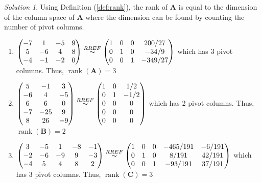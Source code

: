 \documentclass[
]{book}
\theoremstyle{definition}
\theoremstyle{definition}
\theoremstyle{definition}
\theoremstyle{remark}
\newtheorem*{solution}{Solution}
\begin{document}
\begin{solution}

Using Definition (\ref{def:rank}), the rank of \(\mathbf{A}\) is equal to the dimension of the column space of \(\mathbf{A}\) where the dimension can be found by counting the number of pivot columns.

\begin{enumerate}
\def\labelenumi{\arabic{enumi})}
\item
  \(\begin{pmatrix} -7 & 1 & -5 & 9 \\ 5 & -6 & 4 & 8 \\ -4 & -1 & -2 & 0 \end{pmatrix} \stackrel{RREF}{\huge \sim} \begin{pmatrix} 1 & 0 & 0 & 200/27 \\ 0 & 1 & 0 & -34/9 \\ 0 & 0 & 1 & -349/27 \end{pmatrix}\) which has 3 pivot columns. Thus, \(\operatorname{rank}(\mathbf{A}) = 3\)
\item
  \(\begin{pmatrix} 5 & -1 & 3 \\ -6 & 4 & -5 \\ 6 & 6 & 0 \\ -7 & -25 & 9 \\ 8 & 26 & -9 \end{pmatrix} \stackrel{RREF}{\huge \sim} \begin{pmatrix} 1 & 0 & 1/2 \\ 0 & 1 & -1/2 \\ 0 & 0 & 0 \\ 0 & 0 & 0 \\ 0 & 0 & 0 \end{pmatrix}\) which has 2 pivot columns. Thus, \(\operatorname{rank}(\mathbf{B}) = 2\)
\item
  \(\begin{pmatrix} 3 & -5 & 1 & -8 & -1 \\ -2 & -6 & -9 & 9 & -3 \\ -4 & 5 & 4 & 8 & 2 \end{pmatrix} \stackrel{RREF}{\huge \sim} \begin{pmatrix} 1 & 0 & 0 & -465/191 & -6/191 \\ 0 & 1 & 0 & 8/191 & 42/191 \\ 0 & 0 & 1 & -93/191 & 37/191 \end{pmatrix}\) which has 3 pivot columns. Thus, \(\operatorname{rank}(\mathbf{C}) = 3\)
\end{enumerate}

\end{solution}
\end{document}
